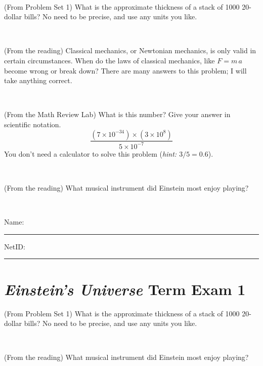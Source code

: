\documentclass[12pt, letterpaper]{article}
\begin{document}
\vfill ~


\clearpage


\begin{problem} (From Problem Set 1)
What is the approximate thickness of a stack of 1000 20-dollar bills?
No need to be precise, and use any units you like.
\end{problem}


\vfill ~

\begin{problem} (From the reading)
Classical mechanics, or Newtonian mechanics, is only valid in certain
circumstances. When do the laws of classical mechanics, like $F =
m\,a$ become wrong or break down? There are many answers to this
problem; I will take anything correct.
\end{problem}


\vfill ~

\begin{problem} (From the Math Review Lab)
What is this number? Give your answer in scientific notation.
$$
\frac{(7\times10^{-34})\times(3\times10^8)}{5\times10^{-7}}
$$
You don't need a calculator to solve this problem (\textit{hint: $3/5=0.6$}).
\end{problem}


\vfill ~

\begin{problem} (From the reading)
What musical instrument did Einstein most enjoy playing?
\end{problem}


\vfill ~


\cleardoublepage



\noindent
Name: \rule[-1ex]{0.60\textwidth}{0.1pt}
NetID: \rule[-1ex]{0.20\textwidth}{0.1pt}

\section*{\textsl{Einstein's Universe} Term Exam 1}
\setcounter{problem}{1}


\begin{problem} (From Problem Set 1)
What is the approximate thickness of a stack of 1000 20-dollar bills?
No need to be precise, and use any units you like.
\end{problem}


\vfill ~

\begin{problem} (From the reading)
What musical instrument did Einstein most enjoy playing?
\end{problem}
\end{document}
